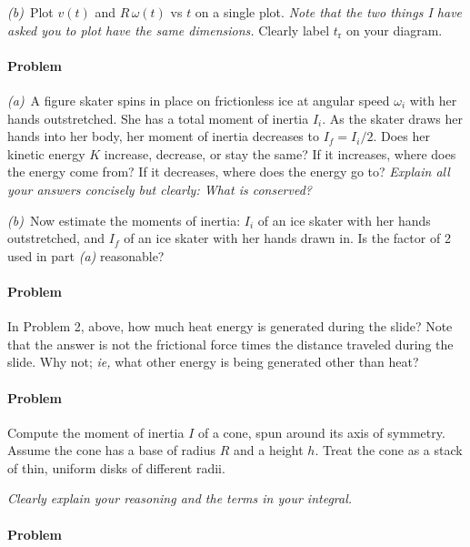 \documentclass[12pt]{article}
\newcounter{problem}
\begin{document}
\textsl{(b)}~Plot $v(t)$ and $R\,\omega(t)$ vs $t$ on a single plot.
\emph{Note that the two things I have asked you to plot have the same
dimensions.}  Clearly label $t_\mathrm{r}$ on your diagram.

\paragraph{Problem~\theproblem}

\textsl{(a)}~A figure skater spins in place on frictionless ice at
angular speed $\omega_i$ with her hands outstretched.  She has a total
moment of inertia $I_i$.  As the skater draws her hands into her body,
her moment of inertia decreases to $I_f=I_i/2$.  Does her kinetic
energy $K$ increase, decrease, or stay the same?  If it increases,
where does the energy come from?  If it decreases, where does the
energy go to?  \emph{Explain all your answers concisely but clearly:
What is conserved?}

\textsl{(b)}~Now estimate the moments of inertia: $I_i$ of an ice
skater with her hands outstretched, and $I_f$ of an ice skater with
her hands drawn in.  Is the factor of 2 used in part \textsl{(a)}
reasonable?

\paragraph{Problem~\theproblem}

In Problem 2, above, how much heat energy is generated during the
slide?  Note that the answer is not the frictional force times the
distance traveled during the slide.  Why not; \textit{ie,} what other
energy is being generated other than heat?

\paragraph{Problem~\theproblem}

Compute the moment of inertia $I$ of a cone, spun around its axis of
symmetry.  Assume the cone has a base of radius $R$ and a height $h$.
Treat the cone as a stack of thin, uniform disks of different radii.

\emph{Clearly explain your reasoning and the terms in your integral.}

\paragraph{Problem~\theproblem}
\end{document}

